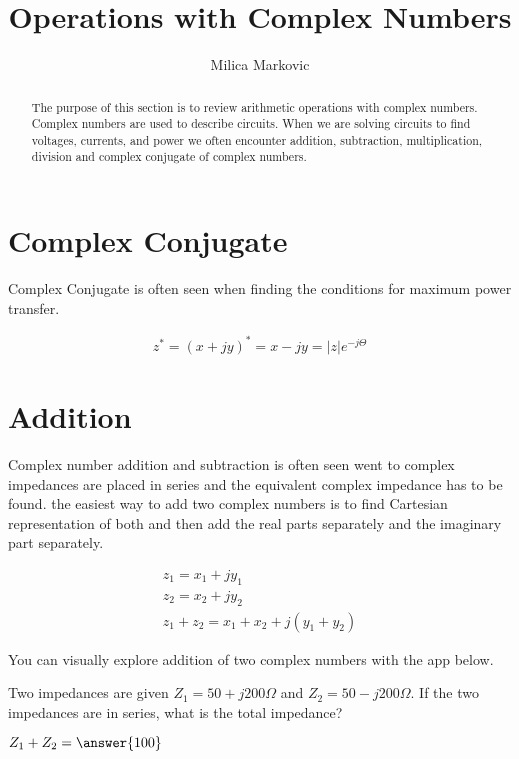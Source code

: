 \documentclass{ximera}
\title{Operations with Complex Numbers}
\author{Milica Markovic}
\begin{document}
  
\begin{abstract}  
The purpose of this section is to review arithmetic operations with complex numbers. Complex numbers are used to describe circuits. When we are solving circuits to find voltages, currents, and power we often encounter addition, subtraction, multiplication, division and complex conjugate of complex numbers.  
\end{abstract}  
\maketitle    
  
  

\section{Complex Conjugate}

 Complex Conjugate is often seen when finding the conditions for maximum power transfer.

\begin{eqnarray}
z^* = (x+ j y)^* = x- j y = |z| e^{-j \Theta}
\end{eqnarray}


\section{Addition}



 Complex number addition and subtraction is often seen went to complex impedances are placed in series and the equivalent  complex impedance has to be found. the easiest way to add two complex numbers is to find Cartesian representation of both and then add the real parts separately and the imaginary part separately.

\begin{eqnarray}
z_1=x_1 + j y_1 \nonumber \\
z_2=x_2 + j y_2 \nonumber \\
z_1+z_2 = x_1 + x_2 + j ( y_1 + y_2)
\end{eqnarray}


You can visually explore addition of two complex numbers with the app below.
\begin{center}  
\end{center} 



\begin{question}
Two impedances are given $Z_1=50+j200 \Omega$ and  $Z_2=50-j200 \Omega$. If the two impedances are in series, what is the total impedance?
  
$Z_1+Z_2 = \answer{100}$  
\end{question} 
\end{document}
